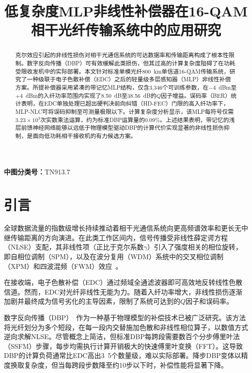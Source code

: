\documentclass[conference]{IEEEtran}
\begin{document}
\title{低复杂度MLP非线性补偿器在16-QAM相干光纤传输系统中的应用研究}

\author{
}

\maketitle

\noindent\textbf{中图分类号：}TN913.7
\vspace{2mm}

\begin{abstract}
克尔效应引起的非线性损伤对相干光通信系统的可达数据率和传输距离构成了根本性限制。数字反向传播（DBP）可有效缓解此类损伤，但其过高的计算复杂度阻碍了在功耗受限收发机中的实际部署。本文针对标准单模光纤800~km单信道16-QAM传输系统，研究了一种级联于电子色散补偿（EDC）之后的轻量级多层感知器（MLP）非线性补偿方案。所提补偿器采用紧凑的带记忆MLP结构，仅含3,346个可训练参数，在$-4$~dBm至$+4$~dBm的入纤功率范围内实现了8.50~dB至38.56~dB的$Q$因子增益。误码率（BER）统计表明，在EDC单独处理已超出硬判决前向纠错（HD-FEC）门限的高入纤功率下，MLP-NLC可将误码抑制至可测量极限以下。计算复杂度分析显示，该MLP每符号仅需$3.23 \times 10^3$次实数乘法运算，约为标准DBP运算量的0.09\%。上述结果表明，带记忆的浅层前馈神经网络能够以远低于物理模型驱动DBP的计算代价实现显著的非线性损伤抑制，是面向低功耗相干接收机的有力候选方案。
\end{abstract}

\section{引言}
\label{sec:introduction}

全球数据流量的指数级增长持续推动着相干光通信系统向更高频谱效率和更长无中继传输距离的方向演进。在此类工作区间内，信号传播受非线性薛定谔方程（NLSE）支配，其非线性项（正比于克尔系数$\gamma$）引入了强度相关的相位旋转，即自相位调制（SPM），以及在波分复用（WDM）系统中的交叉相位调制（XPM）和四波混频（FWM）效应~\cite{agrawal2001}。

在接收端，电子色散补偿（EDC）通过频域全通滤波器即可高效地反转线性色散信道。然而，EDC对光纤非线性无能为力。随着入纤功率增大，非线性损伤逐渐加剧并最终成为信号劣化的主导因素，限制了系统可达到的$Q$因子和误码率。

数字反向传播（DBP）~\cite{ip2008}作为一种基于物理模型的补偿技术已被广泛研究。该方法将光纤划分为多个短段，在每一段内交替施加色散和非线性相位算子，以数值方式逆向求解NLSE。尽管概念上简洁，但标准DBP每跨段需要数百个分步傅里叶法（SSFM）步骤，每步均需执行计算开销极大的快速傅里叶变换（FFT）。这导致DBP的计算负荷通常比EDC高出3~5个数量级，难以实际部署。降步DBP变体以精度换取复杂度，但当每跨段步数降至约10步以下时，补偿性能将显著下降。
\end{document}
